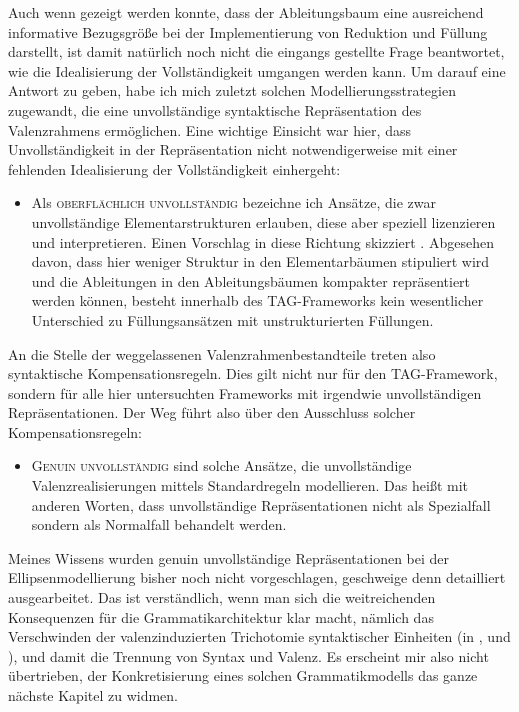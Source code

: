 Auch wenn gezeigt werden konnte, dass der Ableitungsbaum eine ausreichend informative Bezugsgröße bei der Implementierung von Reduktion und Füllung darstellt, ist damit natürlich noch nicht die eingangs gestellte Frage beantwortet, wie die Idealisierung der Vollständigkeit umgangen werden kann. Um darauf eine Antwort zu geben, habe ich mich zuletzt solchen Modellierungsstrategien zugewandt, die eine unvollständige syntaktische Repräsentation des Valenzrahmens ermöglichen. Eine wichtige Einsicht war hier, dass Unvollständigkeit in der Repräsentation nicht notwendigerweise mit einer fehlenden Idealisierung der Vollständigkeit einhergeht:
\begin{itemize}
  \item Als \textsc{oberflächlich unvollständig} bezeichne ich Ansätze, die zwar unvollständige Elementarstrukturen erlauben, diese aber speziell lizenzieren und interpretieren. Einen Vorschlag in diese Richtung skizziert \cite{Sarkar:97}. Abgesehen davon, dass hier weniger Struktur in den Elementarbäumen stipuliert wird und die Ableitungen in den Ableitungsbäumen kompakter repräsentiert werden können, besteht innerhalb des TAG-Frameworks kein wesentlicher Unterschied zu Füllungsansätzen mit unstrukturierten Füllungen.
\end{itemize}  
An die Stelle der weggelassenen Valenzrahmenbestandteile treten also syntaktische Kompensationsregeln. Dies gilt nicht nur für den TAG-Framework, sondern für alle hier untersuchten Frameworks mit irgendwie unvollständigen Repräsentationen. Der Weg führt also über den Ausschluss solcher Kompensationsregeln: 
\begin{itemize}   
  \item \textsc{Genuin unvollständig} sind solche Ansätze, die unvollständige Valenzrealisierungen mittels Standardregeln modellieren. Das heißt mit anderen Worten, dass unvollständige Repräsentationen nicht als Spezialfall sondern als Normalfall behandelt werden. 
\end{itemize}
Meines Wissens wurden genuin unvollständige Repräsentationen bei der Ellipsenmodellierung bisher noch nicht vorgeschlagen, geschweige denn detailliert ausgearbeitet. Das ist verständlich, wenn man sich die weitreichenden  Konsequenzen für die Grammatikarchitektur klar macht, nämlich das Verschwinden der valenzinduzierten  Trichotomie syntaktischer Einheiten (in ,  und ), und damit die Trennung von Syntax und Valenz. Es erscheint mir also nicht übertrieben, der Konkretisierung eines solchen Grammatikmodells das ganze nächste Kapitel zu widmen.



  